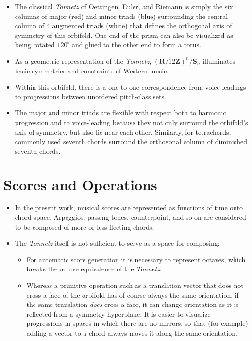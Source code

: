 \documentclass[14pt,letterpaper,onecolumn]{scrartcl}
\begin{document}
\begin{itemize}
\item The classical \emph{Tonnetz} of Oettingen, Euler, and Riemann is simply the six columns of major (red) and minor triads (blue) surrounding the central column of 4 augmented triads (white) that defines the orthogonal axis of symmetry of this orbifold. One end of the prism can also be visualized as being rotated $120 ^{\circ}$ and glued to the other end to form a torus.

\item As a geometric representation of the \emph{Tonnetz}, $\left(\textbf{R}/12\textbf{Z}\right)^{n}/\textbf{S}_{n}$ illuminates basic symmetries and constraints of Western music. 

\newpage

\item Within this orbifold, there is a one-to-one correspondence from voice-leadings to progressions between unordered pitch-class sets.

\item The major and minor triads are flexible with respect both to harmonic progression and to voice-leading because they not only surround the orbifold's axis of symmetry, but also lie near each other. Similarly, for tetrachords, commonly used seventh chords surround the orthogonal column of diminished seventh chords. 

\end{itemize}

\section{Scores and Operations}

\begin{itemize}

\item In the present work, musical scores are represented as functions of time onto chord space. Arpeggios, passing tones, counterpoint, and so on are considered to be composed of more or less fleeting chords.

\item The \emph{Tonnetz} itself is not sufficient to serve as a space for composing:

\begin{itemize}

\item For automatic score generation it is necessary to represent octaves, which breaks the octave equivalence of the \emph{Tonnetz}.

\item Whereas a primitive operation such as a translation vector that does not cross a face of the orbifold has of course always the same orientation, if the same translation \emph{does} cross a face, it can change orientation as it is reflected from a symmetry hyperplane. It is easier to visualize progressions in spaces in which there are no mirrors, so that (for example) adding a vector to a chord always moves it along the same orientation.

\end{itemize}

\end{itemize}
\end{document}
